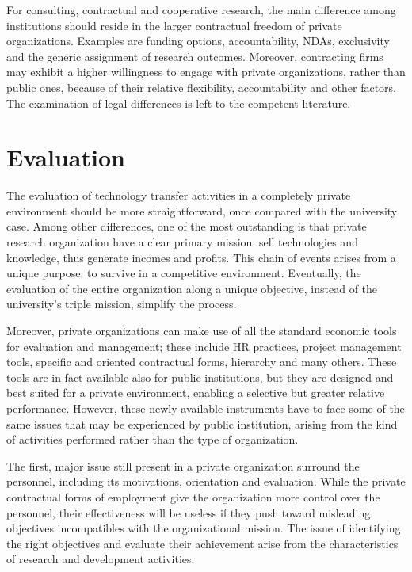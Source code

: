 For consulting, contractual and cooperative research, the main difference among institutions should reside in the larger contractual freedom of private organizations. Examples are funding options, accountability, NDAs, exclusivity and the generic assignment of research outcomes. Moreover, contracting firms may exhibit a higher willingness to engage with private organizations, rather than public ones, because of their relative flexibility, accountability and other factors. The examination of legal differences is left to the competent literature.

\section{Evaluation}

The evaluation of technology transfer activities in a completely private environment should be more straightforward, once compared with the university case. Among other differences, one of the most outstanding is that private research organization have a clear primary mission: sell technologies and knowledge, thus generate incomes and profits. This chain of events arises from a unique purpose: to survive in a competitive environment. Eventually, the evaluation of the entire organization along a unique objective, instead of the university's triple mission, simplify the process. 

Moreover, private organizations can make use of all the standard economic tools for evaluation and management; these include HR practices, project management tools, specific and oriented contractual forms, hierarchy and many others. These tools are in fact available also for public institutions, but they are designed and best suited for a private environment, enabling a selective but greater relative performance. However, these newly available instruments have to face some of the same issues that may be experienced by public institution, arising from the kind of activities performed rather than the type of organization.

The first, major issue still present in a private organization surround the personnel, including its motivations, orientation and evaluation. While the private contractual forms of employment give the organization more control over the personnel, their effectiveness will be useless if they push toward misleading objectives incompatibles with the organizational mission. The issue of identifying the right objectives and evaluate their achievement arise from the characteristics of research and development activities.

